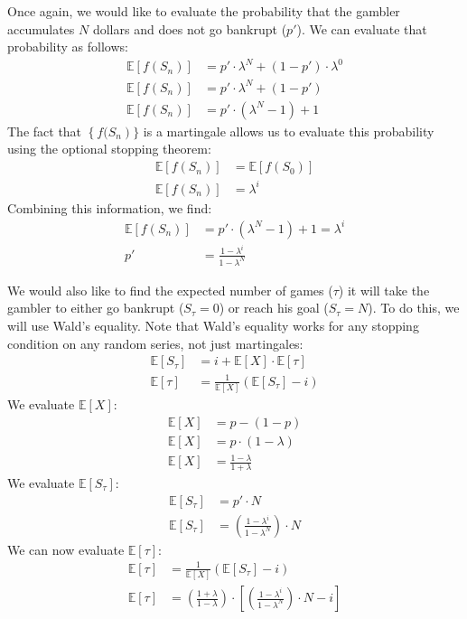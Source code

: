 Once again, we would like to evaluate the probability that the gambler accumulates $N$ dollars 
and does not go bankrupt ($p'$).  We can evaluate that probability as follows:
\begin{align}
  \mathbb{E}[f(S_n)] &= p' \cdot \lambda^N + (1-p') \cdot \lambda^0 \\
  \mathbb{E}[f(S_n)] &= p' \cdot \lambda^N + (1-p') \\
  \mathbb{E}[f(S_n)] &= p' \cdot \left(\lambda^N - 1\right) + 1
\end{align}
The fact that $\left\{f(S_n\right)\}$ is a martingale allows
us to evaluate this probability using the optional stopping theorem:
\begin{align}
  \mathbb{E}[f(S_n)] &= \mathbb{E}[f(S_0)] \\
  \mathbb{E}[f(S_n)] &= \lambda^i
\end{align}
Combining this information, we find:
\begin{align}
  \mathbb{E}[f(S_n)] &= p' \cdot \left(\lambda^N - 1\right) + 1 = \lambda^i \\
   p' &= \frac{1-\lambda^i}{1-\lambda^N}
\end{align}

We would also like to find the expected number of games ($\tau$) it will take the 
gambler to either go bankrupt ($S_\tau = 0$) or reach his goal ($S_\tau = N$).
To do this, we will use Wald's equality.
Note that Wald's equality works for any stopping condition on 
any random series, not just martingales:
\begin{align}
  \mathbb{E}[S_\tau] &= i + \mathbb{E}[X]\cdot\mathbb{E}[\tau] \\
  \mathbb{E}[\tau] &= \frac{1}{\mathbb{E}[X]}\left(\mathbb{E}[S_\tau] - i\right)
\end{align}
We evaluate $\mathbb{E}[X]$:
\begin{align}
  \mathbb{E}[X] &= p - (1-p) \\ 
  \mathbb{E}[X] &= p\cdot(1-\lambda) \\
  \mathbb{E}[X] &= \frac{1-\lambda}{1+\lambda}
\end{align}
We evaluate $\mathbb{E}[S_\tau]$:
\begin{align}
  \mathbb{E}[S_\tau] &= p'\cdot N \\
  \mathbb{E}[S_\tau] &= \left(\frac{1-\lambda^i}{1-\lambda^N }\right) \cdot N 
\end{align}
We can now evaluate $\mathbb{E}[\tau]$:
\begin{align}
  \mathbb{E}[\tau] &= \frac{1}{\mathbb{E}[X]}\left(\mathbb{E}[S_\tau] - i\right) \\ 
  \mathbb{E}[\tau] &= \left(\frac{1+\lambda}{1-\lambda}\right)\cdot \left[\left(\frac{1-\lambda^i}{1-\lambda^N}\right) \cdot N  - i\right]
\end{align}
